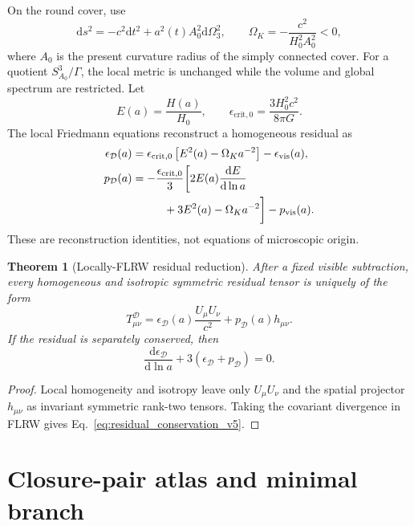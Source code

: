 \documentclass[
  aps,
  prd,
  reprint,
  superscriptaddress,
  floatfix,
  nofootinbib,
  longbibliography
]{revtex4-2}
\theoremstyle{plain}
\newtheorem{theorem}{Theorem}
\theoremstyle{definition}
\theoremstyle{remark}
\newcommand{\dd}{\mathrm d}
\newcommand{\D}{\mathcal D}
\newcommand{\vis}{\mathrm{vis}}
\newcommand{\crit}{\mathrm{crit}}
\newcommand{\Ok}{\Omega_K}
\newcommand{\eps}{\epsilon}
\begin{document}
On the round cover, use
\begin{equation}
\dd s^2=-c^2\dd t^2+a^2(t)A_0^2\dd\Omega_3^2,
\qquad
\Ok=-\frac{c^2}{H_0^2A_0^2}<0,
\label{eq:closed_metric_v5}
\end{equation}
where \(A_0\) is the present curvature radius of the simply connected cover.
For a quotient \(S^3_{A_0}/\Gamma\), the local metric is unchanged while the
volume and global spectrum are restricted.  Let
\begin{equation}
E(a)=\frac{H(a)}{H_0},
\qquad
\eps_{\crit,0}=\frac{3H_0^2c^2}{8\pi G} .
\end{equation}
The local Friedmann equations reconstruct a homogeneous residual as
\begin{align}
\eps_\D(a)
&=\eps_{\crit,0}\left[E^2(a)-\Ok a^{-2}\right]
-\eps_{\vis}(a),
\label{eq:eps_reconstruction_v5}\\
p_\D(a)
&=-\frac{\eps_{\crit,0}}{3}\biggl[
2E(a)\frac{\dd E}{\dd\ln a}
\nonumber\\
&\hspace{1.0cm}
+3E^2(a)-\Ok a^{-2}
\biggr]-p_{\vis}(a).
\label{eq:p_reconstruction_v5}
\end{align}
These are reconstruction identities, not equations of microscopic origin.

\begin{theorem}[Locally-FLRW residual reduction]
After a fixed visible subtraction, every homogeneous and isotropic symmetric
residual tensor is uniquely of the form
\begin{equation}
T^\D_{\mu\nu}=\eps_\D(a)\frac{U_\mu U_\nu}{c^2}+p_\D(a)h_{\mu\nu} .
\label{eq:flrw_residual_tensor_v5}
\end{equation}
If the residual is separately conserved, then
\begin{equation}
\frac{\dd\eps_\D}{\dd\ln a}+3(\eps_\D+p_\D)=0 .
\label{eq:residual_conservation_v5}
\end{equation}
\end{theorem}

\begin{proof}
Local homogeneity and isotropy leave only \(U_\mu U_\nu\) and the spatial
projector \(h_{\mu\nu}\) as invariant symmetric rank-two tensors.  Taking the
covariant divergence in FLRW gives Eq.~\eqref{eq:residual_conservation_v5}.
\end{proof}

\section{Closure-pair atlas and minimal branch}
\end{document}
